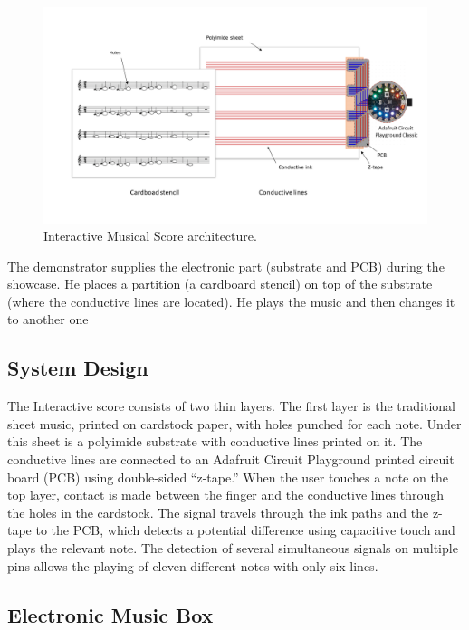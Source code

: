\begin{figure}[h]
    \centering
    \includegraphics{images/IS_schema.png}
    \caption{Interactive Musical Score architecture.}
    \label{fig:IS_schema}
\end{figure}

The demonstrator supplies the electronic part (substrate and PCB) during the
showcase. He places a partition (a cardboard stencil) on top of the substrate (where
the conductive lines are located). He plays the music and then changes it to another
one

\subsection{System Design}

The Interactive score consists of two thin layers. The first layer is the traditional sheet
music, printed on cardstock paper, with holes punched for each note. Under this sheet
is a polyimide substrate with conductive lines printed on it. 
The conductive lines are connected to an Adafruit Circuit Playground printed circuit
board (PCB) using double-sided “z-tape.”
When the user touches a note on the top layer, contact is made between the finger and
the conductive lines through the holes in the cardstock. The signal travels through the
ink paths and the z-tape to the PCB, which detects a potential difference using
capacitive touch and plays the relevant note. The detection of several simultaneous
signals on multiple pins allows the playing of eleven different notes with only six lines.


\subsection{Electronic Music Box}


